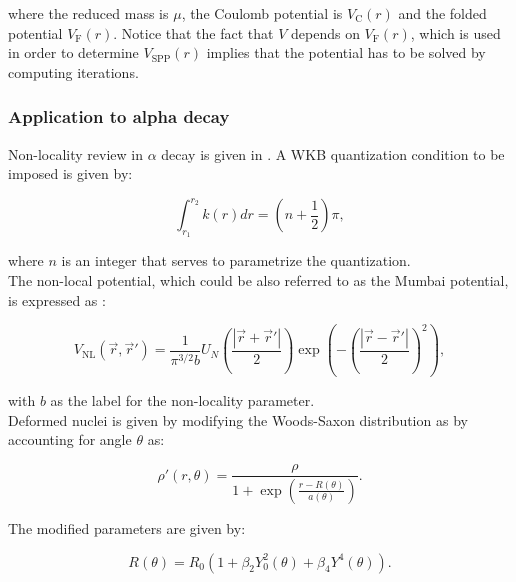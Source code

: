 \documentclass[openany]{book}
\begin{document}
where the reduced mass is $\mu$, the Coulomb potential is $V_{\mathrm{C}}(r)$ and the folded potential  $V_{\mathrm{F}}(r)$. Notice that the fact that $V$ depends on $V_{\mathrm{F}}(r)$, which is used in order to determine $V_{\mathrm{SPP}} (r)$ implies that the potential has to be solved by computing iterations. \\


\subsubsection{Application to alpha decay}

Non-locality review in $\alpha$ decay is given in \cite{rojas-gamboa_velasquez_kelkar_upadhyay_2022}. A WKB quantization condition to be imposed is given by:

\begin{equation}\label{potential_nonLocal_WKB_quantization}
	\int_{r_1}^{r_2} {k(r) dr} = \left (n + \frac{1}{2} \right )\pi,
\end{equation}

where $n$ is an integer that serves to parametrize the quantization. \\

The non-local potential, which could be also referred to as the Mumbai potential, is expressed as \cite{upadhyay_bhagwat_jain_2017}:

\begin{equation}\label{potential_nonLocal_gaussian}
	V_{\mathrm{NL}} (\vec r, \vec r') = \frac{1}{\pi^{3/2}b} U_N \left( \frac{|\vec r + \vec r'|}{2}\right) \exp \left(- \left( \frac{|\vec r - \vec r'|}{2}\right)^2\right),
\end{equation}

with $b$ as the label for the non-locality parameter.\\

Deformed nuclei is given by modifying the Woods-Saxon distribution as by accounting for angle $\theta$ as:


 \begin{equation}\label{potential_nonLocal_modifiedWoodsSaxon}
 	\rho'(r, \theta) = \frac{\rho }{1+\exp{\left(\frac{r-R(\theta)}{a(\theta)}\right)}}.
 \end{equation}
 
The modified parameters are given by:

 \begin{equation}\label{potential_nonLocal_modifiedWoodsSaxon_r}
	R(\theta) = R_0(1 + \beta_2 Y^{2}_{0}(\theta) + \beta_4Y^{4}(\theta)).
\end{equation}
\end{document}
